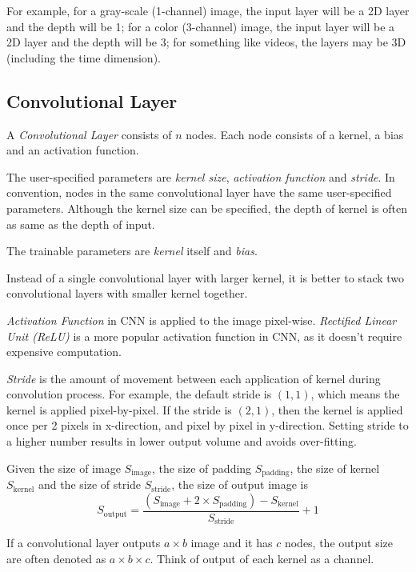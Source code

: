 \documentclass{note}
\begin{document}
For example, for a gray-scale (1-channel) image, the input layer will be a 2D layer and the depth will be 1; for a color (3-channel) image, the input layer will be a 2D layer and the depth will be 3; for something like videos, the layers may be 3D (including the time dimension).

\subsection{Convolutional Layer}

A \textit{Convolutional Layer} consists of $n$ nodes. Each node consists of a kernel, a bias and an activation function. 

The user-specified parameters are \textit{kernel size}, \textit{activation function} and \textit{stride}. In convention, nodes in the same convolutional layer have the same user-specified parameters. Although the kernel size can be specified, the depth of kernel is often as same as the depth of input.

The trainable parameters are \textit{kernel} itself and \textit{bias}. 

\begin{tip}
    Instead of a single convolutional layer with larger kernel, it is better to stack two convolutional layers with smaller kernel together. 
\end{tip}

\textit{Activation Function} in CNN is applied to the image pixel-wise. \textit{Rectified Linear Unit (ReLU)} is a more popular activation function in CNN, as it doesn't require expensive computation.

\textit{Stride} is the amount of movement between each application of kernel during convolution process. For example, the default stride is $(1, 1)$, which means the kernel is applied pixel-by-pixel. If the stride is $(2, 1)$, then the kernel is applied once per 2 pixels in x-direction, and pixel by pixel in y-direction. Setting stride to a higher number results in lower output volume and avoids over-fitting.

Given the size of image $S_\text{image}$, the size of padding $S_\text{padding}$, the size of kernel $S_\text{kernel}$ and the size of stride $S_\text{stride}$, the size of output image is
$$
S_\text{output} = \frac{(S_\text{image} + 2 \times S_\text{padding}) - S_\text{kernel}}{S_\text{stride}} + 1
$$

\begin{important}
    If a convolutional layer outputs $a \times b$ image and it has $c$ nodes, the output size are often denoted as $a \times b \times c$. Think of output of each kernel as a channel.
\end{important}
\end{document}
